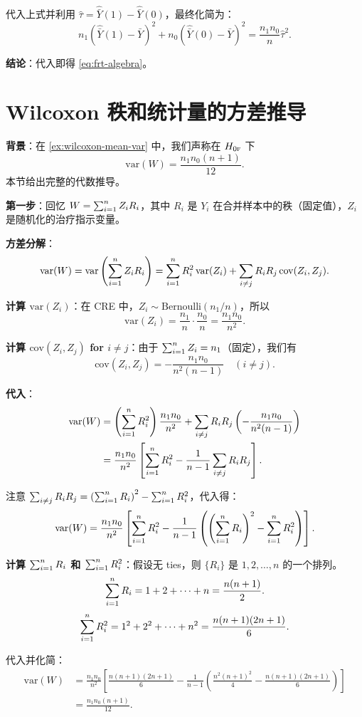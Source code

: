 代入上式并利用 $\hat{\tau} = \hat{\bar{Y}}(1) - \hat{\bar{Y}}(0)$，最终化简为：
\[
n_1 (\hat{\bar{Y}}(1) - \bar{Y})^2 + n_0 (\hat{\bar{Y}}(0) - \bar{Y})^2 = \frac{n_1 n_0}{n} \hat{\tau}^2 .
\]

\textbf{结论}：代入即得 \cref{eq:frt-algebra}。

\section{Wilcoxon 秩和统计量的方差推导}\label{sec:wilcoxon-variance-derivation}\label{ex:wilcoxon-mean-var}

\textbf{背景}：在 \ref{ex:wilcoxon-mean-var} 中，我们声称在 $H_{0\textsc{f}}$ 下
\[
\text{var}(W) = \frac{n_1 n_0 (n+1)}{12} .
\]
本节给出完整的代数推导。

\textbf{第一步}：回忆 $W = \sum_{i=1}^n Z_i R_i$，其中 $R_i$ 是 $Y_i$ 在合并样本中的秩（固定值），$Z_i$ 是随机化的治疗指示变量。

\textbf{方差分解}：
\[
\text{var}(W) = \text{var}\left( \sum_{i=1}^n Z_i R_i \right) = \sum_{i=1}^n R_i^2 \, \text{var}(Z_i) + \sum_{i \neq j} R_i R_j \, \text{cov}(Z_i, Z_j) .
\]

\textbf{计算 $\text{var}(Z_i)$}：在 CRE 中，$Z_i \sim \text{Bernoulli}(n_1/n)$，所以
\[
\text{var}(Z_i) = \frac{n_1}{n} \cdot \frac{n_0}{n} = \frac{n_1 n_0}{n^2} .
\]

\textbf{计算 $\text{cov}(Z_i, Z_j)$ for $i \neq j$}：由于 $\sum_{i=1}^n Z_i = n_1$（固定），我们有
\[
\text{cov}(Z_i, Z_j) = -\frac{n_1 n_0}{n^2(n-1)} \quad (i \neq j) .
\]

\textbf{代入}：
\[
\begin{aligned}
\text{var}(W) &= \left( \sum_{i=1}^n R_i^2 \right) \frac{n_1 n_0}{n^2} + \sum_{i \neq j} R_i R_j \left( -\frac{n_1 n_0}{n^2(n-1)} \right) \\
&= \frac{n_1 n_0}{n^2} \left[ \sum_{i=1}^n R_i^2 - \frac{1}{n-1} \sum_{i \neq j} R_i R_j \right] .
\end{aligned}
\]

注意 $\sum_{i \neq j} R_i R_j = \left( \sum_{i=1}^n R_i \right)^2 - \sum_{i=1}^n R_i^2$，代入得：
\[
\text{var}(W) = \frac{n_1 n_0}{n^2} \left[ \sum_{i=1}^n R_i^2 - \frac{1}{n-1} \left( \left( \sum_{i=1}^n R_i \right)^2 - \sum_{i=1}^n R_i^2 \right) \right] .
\]

\textbf{计算 $\sum_{i=1}^n R_i$ 和 $\sum_{i=1}^n R_i^2$}：假设无 ties，则 $\{R_i\}$ 是 $1, 2, \ldots, n$ 的一个排列。
\[
\sum_{i=1}^n R_i = 1 + 2 + \cdots + n = \frac{n(n+1)}{2} .
\]
\[
\sum_{i=1}^n R_i^2 = 1^2 + 2^2 + \cdots + n^2 = \frac{n(n+1)(2n+1)}{6} .
\]

代入并化简：
\[
\begin{aligned}
\text{var}(W) &= \frac{n_1 n_0}{n^2} \left[ \frac{n(n+1)(2n+1)}{6} - \frac{1}{n-1} \left( \frac{n^2(n+1)^2}{4} - \frac{n(n+1)(2n+1)}{6} \right) \right] \\
&= \frac{n_1 n_0 (n+1)}{12} .
\end{aligned}
\]

